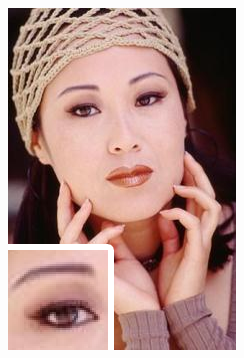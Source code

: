 \documentclass[
			fontsize = 12pt,
			paper = a4
			]
			{scrartcl}%
\newcommand{\?}{\ensuremath{^\texttt{\textbf [CITATION~NEEDED]}}}
\begin{document}
\begin{figure}[!ht]
\begin{subfigure}[b]{0.3\textwidth}
     \end{subfigure}\\
     \vspace{5mm}
     \begin{subfigure}[b]{0.3\textwidth}
         \centering
         \includegraphics[width=\textwidth]{fig/examples/woman_GT}
     \end{subfigure}
     \hfill
     \begin{subfigure}[b]{0.3\textwidth}
         \centering

\end{subfigure}
\end{figure}
\end{document}

